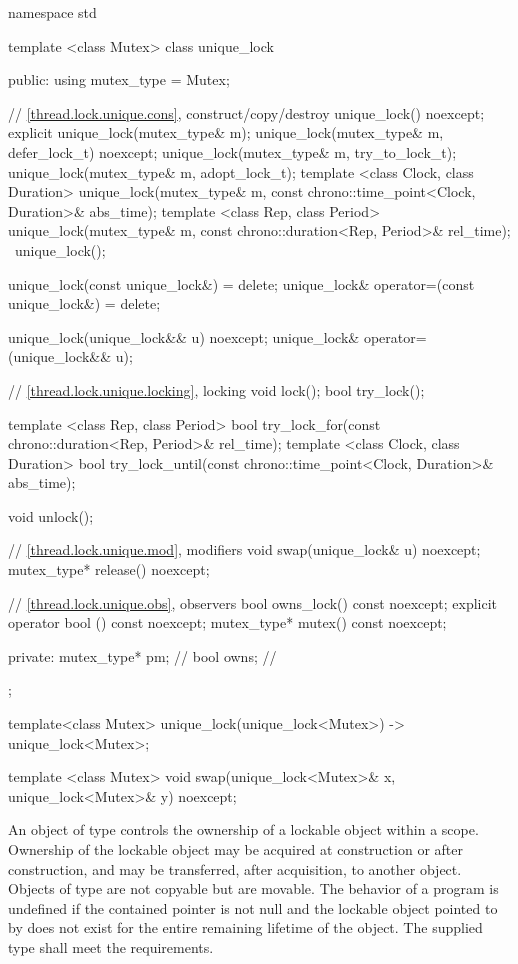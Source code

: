 %
\begin{codeblock}
namespace std {
  template <class Mutex>
  class unique_lock {
  public:
    using mutex_type = Mutex;

    // \ref{thread.lock.unique.cons}, construct/copy/destroy
    unique_lock() noexcept;
    explicit unique_lock(mutex_type& m);
    unique_lock(mutex_type& m, defer_lock_t) noexcept;
    unique_lock(mutex_type& m, try_to_lock_t);
    unique_lock(mutex_type& m, adopt_lock_t);
    template <class Clock, class Duration>
      unique_lock(mutex_type& m, const chrono::time_point<Clock, Duration>& abs_time);
    template <class Rep, class Period>
      unique_lock(mutex_type& m, const chrono::duration<Rep, Period>& rel_time);
    ~unique_lock();

    unique_lock(const unique_lock&) = delete;
    unique_lock& operator=(const unique_lock&) = delete;

    unique_lock(unique_lock&& u) noexcept;
    unique_lock& operator=(unique_lock&& u);

    // \ref{thread.lock.unique.locking}, locking
    void lock();
    bool try_lock();

    template <class Rep, class Period>
      bool try_lock_for(const chrono::duration<Rep, Period>& rel_time);
    template <class Clock, class Duration>
      bool try_lock_until(const chrono::time_point<Clock, Duration>& abs_time);

    void unlock();

    // \ref{thread.lock.unique.mod}, modifiers
    void swap(unique_lock& u) noexcept;
    mutex_type* release() noexcept;

    // \ref{thread.lock.unique.obs}, observers
    bool owns_lock() const noexcept;
    explicit operator bool () const noexcept;
    mutex_type* mutex() const noexcept;

  private:
    mutex_type* pm; // \expos
    bool owns;      // \expos
  };

  template<class Mutex> unique_lock(unique_lock<Mutex>) -> unique_lock<Mutex>;

  template <class Mutex>
    void swap(unique_lock<Mutex>& x, unique_lock<Mutex>& y) noexcept;
}
\end{codeblock}

\pnum
An object of type  controls the ownership of a lockable
object within a scope. Ownership of the lockable object may be acquired at
construction or after construction, and may be transferred, after
acquisition, to another  object. Objects of type  are not
copyable but are movable. The behavior of a program is undefined if the contained pointer
 is not null and the lockable object pointed
to by  does not exist for the entire remaining
lifetime of the  object. The supplied
 type shall meet the 
requirements.

